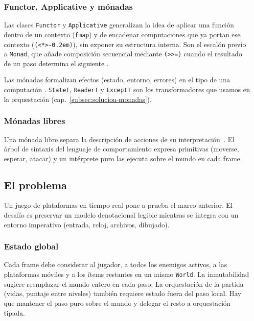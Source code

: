\subsubsection{Functor, Applicative y mónadas}
\label{subsubsec:teoria-monadas}

Las clases \texttt{Functor} y \texttt{Applicative} generalizan la idea de aplicar una
función dentro de un contexto (\texttt{fmap}) y de encadenar computaciones que ya portan ese
contexto (\texttt{(<*>\kern-0.2em)}), sin exponer su estructura interna. Son el escalón previo a
\texttt{Monad}, que añade composición secuencial mediante \texttt{(>\textgreater=)} cuando el resultado
de un paso determina el siguiente \cite{hutton2016programming}.

Las mónadas formalizan efectos (estado, entorno, errores) en el tipo de una
computación \cite{hutton2016programming}. \texttt{StateT}, \texttt{ReaderT} y
\texttt{ExceptT} son los transformadores que usamos en la orquestación
(cap.~\ref{subsec:solucion-monadas}).

\subsubsection{Mónadas libres}
\label{subsubsec:teoria-free}

Una mónada libre separa la descripción de acciones de su interpretación~\cite{free}.
El árbol de sintaxis del lenguaje de comportamiento expresa primitivas (moverse, esperar, atacar) y un
intérprete puro las ejecuta sobre el mundo en cada frame.

\subsection{El problema}
\label{subsec:el-problema}

Un juego de plataformas en tiempo real pone a prueba el marco anterior. El desafío es
preservar un modelo denotacional legible mientras se integra con un entorno imperativo
(entrada, reloj, archivos, dibujado).

\subsubsection{Estado global}
\label{subsubsec:problema-estado}

Cada frame debe considerar al jugador, a todos los enemigos activos, a las
plataformas móviles y a los ítems restantes en un mismo \texttt{World}. La inmutabilidad
sugiere reemplazar el mundo entero en cada paso. La orquestación de la partida (vidas,
puntaje entre niveles) también requiere estado fuera del paso local. Hay que mantener
el paso puro sobre el mundo y delegar el resto a orquestación tipada.

